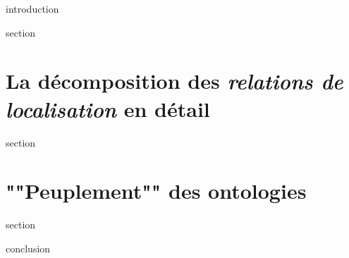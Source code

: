 \chaptertoc{}

\label{sec:5-int}
{introduction}

{section}

\section{La décomposition des \emph{relations de localisation} en
  détail}
\label{sec:5-1}
{section}

\section{""Peuplement"" des ontologies}
\label{sec:5-2}
{section}

\label{sec:5-cnc}
{conclusion}


